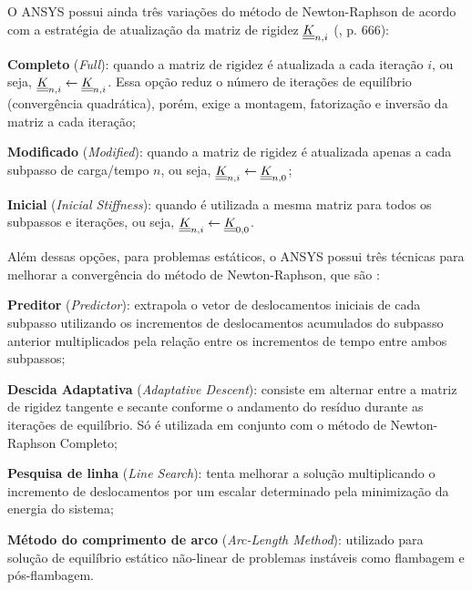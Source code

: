 O ANSYS possui ainda três variações do método de Newton-Raphson de acordo com a estratégia de atualização da matriz de rigidez $\underline{\underline K}_{n,i}$ (\citeyear{ANSYS2018}, p. 666): 
\begin{alineas}
	
	\item \textbf{Completo} (\textit{Full}): quando a matriz de rigidez é atualizada a cada iteração $i$, ou seja, $\underline{\underline K}_{n,i} \leftarrow \underline{\underline K}_{n,i}$. Essa opção reduz o número de iterações de equilíbrio (convergência quadrática), porém, exige a montagem, fatorização e inversão da matriz a cada iteração;
	
	\item \textbf{Modificado} (\textit{Modified}): quando a matriz de rigidez é atualizada apenas a cada subpasso de carga/tempo $n$, ou seja, $\underline{\underline K}_{n,i} \leftarrow \underline{\underline K}_{n,0}$; 
	
	\item \textbf{Inicial} (\textit{Inicial Stiffness}): quando é utilizada a mesma matriz para todos os subpassos e iterações, ou seja, $\underline{\underline K}_{n,i} \leftarrow \underline{\underline K}_{0,0}$. 
	
\end{alineas}

Além dessas opções, para problemas estáticos, o ANSYS possui três técnicas para melhorar a convergência do método de Newton-Raphson, que são \cite[p. 668-673]{ANSYS2018}:

\begin{alineas}
	\item \textbf{Preditor} (\textit{Predictor}): extrapola o vetor de deslocamentos iniciais de cada subpasso utilizando os incrementos de deslocamentos acumulados do subpasso anterior multiplicados pela relação entre os incrementos de tempo entre ambos subpassos;
	
	\item \textbf{Descida Adaptativa} (\textit{Adaptative Descent}): consiste em alternar entre a matriz de rigidez tangente e secante conforme o andamento do resíduo durante as iterações de equilíbrio. Só é utilizada em conjunto com o método de Newton-Raphson Completo;
	
	\item \textbf{Pesquisa de linha} (\textit{Line Search}): tenta melhorar a solução multiplicando o incremento de deslocamentos por um escalar determinado pela minimização da energia do sistema;
	
	\item \textbf{Método do comprimento de arco} (\textit{Arc-Length Method}): utilizado para solução de equilíbrio estático não-linear de problemas instáveis como flambagem e pós-flambagem.
	
\end{alineas}

